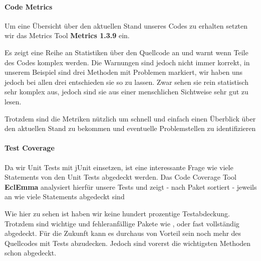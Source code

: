 \paragraph{Code Metrics}

Um eine Übersicht über den aktuellen Stand unseres Codes zu erhalten setzten wir das Metrics Tool \textbf{Metrics 1.3.9} ein. 


Es zeigt eine Reihe an Statistiken über den Quellcode an und warnt wenn Teile des Codes komplex werden. 
Die Warnungen sind jedoch nicht immer korrekt, in unserem Beispiel sind drei Methoden mit Problemen markiert, wir haben uns jedoch bei allen drei entschieden sie so zu lassen. Zwar sehen sie rein statistisch sehr komplex aus, jedoch sind sie aus einer menschlichen Sichtweise sehr gut zu lesen.

Trotzdem sind die Metriken nützlich um schnell und einfach einen Überblick über den aktuellen Stand zu bekommen und eventuelle Problemstellen zu identifizieren

\paragraph{Test Coverage}

Da wir Unit Tests mit jUnit einsetzen, ist eine interessante Frage wie viele Statements von den Unit Tests abgedeckt werden.
Das Code Coverage Tool \textbf{EclEmma} analysiert hierfür unsere Tests und zeigt - nach Paket sortiert - jeweils an wie viele Statements abgedeckt sind


Wie hier zu sehen ist haben wir keine hundert prozentige Testabdeckung. Trotzdem sind wichtige und fehleranfällige Pakete wie ,  oder  fast vollständig abgedeckt.
Für die Zukunft kann es durchaus von Vorteil sein noch mehr des Quellcodes mit Tests abzudecken. Jedoch sind vorerst die wichtigsten Methoden schon abgedeckt.